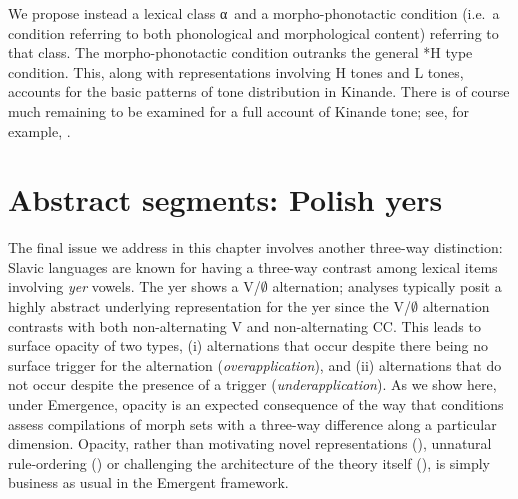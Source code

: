 We propose instead a lexical class α\ and a morpho-phonotactic condition (i.e.\ a condition referring to both phonological and morphological content) referring to that class. The morpho-phonotactic condition outranks the general *H type condition. This, along with representations involving H tones and L tones, accounts for the basic patterns of tone distribution in Kinande. There is of course much remaining to be examined for a full account of Kinande tone; see, for example, \citet{Hyman+:1985, Mutaka:1994, Mutaka:2001, Jones:2014, Archangeli+:2014abidjan}.


\section{Abstract segments: Polish yers}\label{section_Polish}
\label{URs_Polish_section}

The final issue we address in this chapter involves another three-way distinction: Slavic languages are known for having a three-way contrast among lexical items involving  \textit{yer} vowels. The  yer shows a V/$\emptyset$  alternation; analyses typically posit a highly abstract underlying representation for the yer since the V/$\emptyset$ alternation contrasts with both non-alternating V and non-alternating CC. This leads to surface opacity of two types, (i) alternations that occur despite there being no surface trigger for the alternation (\textit{overapplication}), and (ii) alternations that do not occur despite the presence of a trigger (\textit{underapplication}). As we show here, under Emergence, opacity is an expected consequence of the way that conditions assess compilations of  morph sets with a three-way difference along a particular dimension. Opacity, rather than motivating novel representations (\citealt{Gussmann:1980, Rubach:1984, Spencer:1986, Rubach:1986, Kenstowicz+:1987, Piotrowski+:1992, Szpyra:1992}),   unnatural rule-ordering (\citealt{Kiparsky:1971, Kiparsky:1973abstractness, Bakovic:2011-Wiley}) or challenging  the architecture of the theory itself (\citealt{Anttila:1997, Anttila:2002, Jarosz:2005_CLS, Gouskova:2012, Iwan:2015}), is simply business as usual in the Emergent framework.

